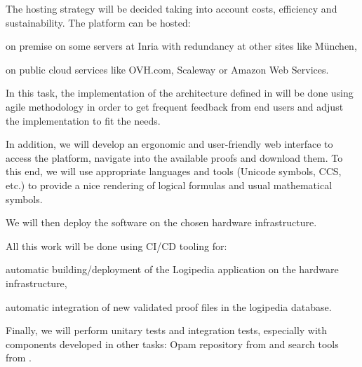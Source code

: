 \begin{workpackage}[id=access,type=RTD,wphases=1-48,
  short=Access,%
  title={Access},
  lead=Inr,InrRM=48,OcaRM=6,EduRM=12]
\begin{tasklist}
\begin{task}[id=archi,
      title=Setting up the hardware and software architecture,
      shorttitle=Setting up the hardware and software architecture,
      lead=Inr,InrRM=6,wphases=1-6]
    The hosting strategy will be decided taking into account costs,
    efficiency and sustainability. The platform can be hosted:
    \begin{compactitem}
    \item on premise on some servers at Inria with redundancy at other
      sites like München,
    \item on public cloud services like OVH.com, Scaleway or Amazon
      Web Services.
    \end{compactitem}
  \end{task}

  \begin{task}[id=web,
      title=Giving access to the infrastructure on the world-wide web,
      shorttitle=Giving access to the infrastructure on the world-wide web,
      lead=Inr,InrRM=12,wphases=7-24]   
    In this task, the implementation of the architecture defined in
     will be done using agile methodology in
    order to get frequent feedback from end users and adjust the
    implementation to fit the needs.

    In addition, we will develop an ergonomic and user-friendly web
    interface to access the platform, navigate into the available
    proofs and download them. To this end, we will use appropriate
    languages and tools (Unicode symbols, CCS, etc.) to provide a nice
    rendering of logical formulas and usual mathematical symbols.
    
    We will then deploy the software on the chosen hardware
    infrastructure.

    All this work will be done using CI/CD tooling for:
    \begin{compactitem}
    \item automatic building/deployment of the Logipedia application
      on the hardware infrastructure,
    \item automatic integration of new validated proof files in the
      logipedia database.
    \end{compactitem}

    Finally, we will perform unitary tests and integration tests,
    especially with components developed in other tasks: Opam
    repository from  and search tools from
    .
  \end{task}


\end{tasklist}
\end{workpackage}
